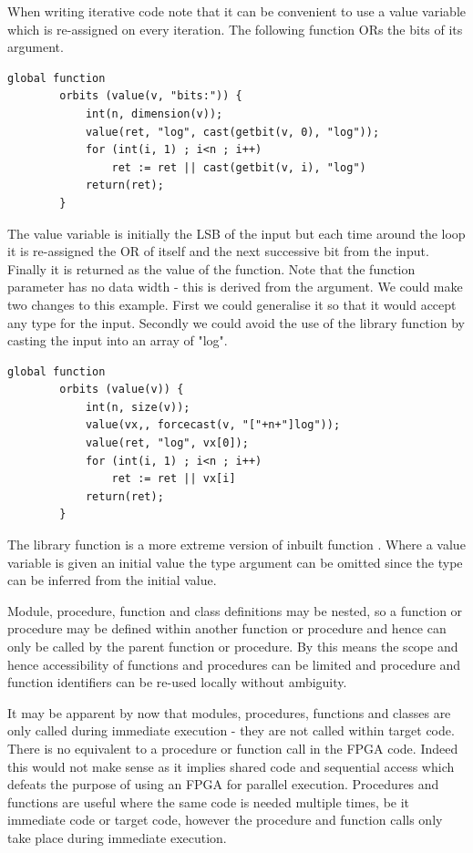         When writing iterative code note that it can be convenient to
        use a value variable which is re-assigned on every iteration. The following
        function ORs the bits of its argument.
        \begin{lstlisting}[language=threepl]
        global function
        orbits (value(v, "bits:")) {
            int(n, dimension(v));
            value(ret, "log", cast(getbit(v, 0), "log"));
            for (int(i, 1) ; i<n ; i++)
                ret := ret || cast(getbit(v, i), "log")
            return(ret);
        }
        \end{lstlisting}
        The value variable  is initially the LSB of the input but each time
        around the loop it is re-assigned the OR of itself and the next successive bit
        from the input. Finally it is returned as the value of the function. Note that
        the function parameter has no data width - this is derived from the
        argument. We could make two changes to this example. First we could generalise
        it so that it would accept any type for the input. Secondly we could
        avoid the use of the library function  by casting the input
        into an array of "log".
        \begin{lstlisting}[language=threepl]
        global function
        orbits (value(v)) {
            int(n, size(v));
            value(vx,, forcecast(v, "["+n+"]log"));
            value(ret, "log", vx[0]);
            for (int(i, 1) ; i<n ; i++)
                ret := ret || vx[i]
            return(ret);
        }
        \end{lstlisting}
        The library function  is a more extreme version of inbuilt
        function .
        Where a value variable is given an initial value the type argument can be
        omitted since the type can be inferred from the initial value.

        Module, procedure, function and class definitions may be nested, so a function or
        procedure may be defined within another function or procedure and hence can
        only be called by the parent function or procedure. By this means the scope and
        hence accessibility of functions and procedures can be limited and procedure
        and function identifiers can be re-used locally without ambiguity.

        It may be apparent by now that modules, procedures, functions and classes are only
        called during immediate execution - they are not called within target code. There
        is no equivalent to a procedure or function call in the FPGA code. Indeed this
        would not make sense as it implies shared code and sequential access which defeats
        the purpose of using an FPGA for parallel execution. Procedures and functions are
        useful where the same code is needed multiple times, be it immediate code or target
        code, however the procedure and function calls only take place during immediate
        execution.

